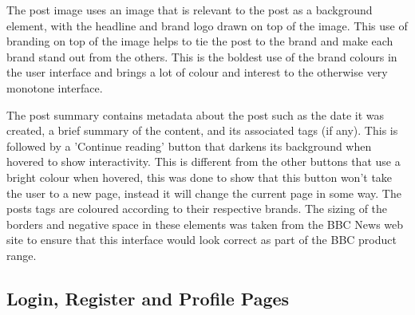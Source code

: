 \documentclass[12pt,titlepage]{article}
\begin{document}
    The post image uses an image that is relevant to the post as a background
    element, with the headline and brand logo drawn on top of the image. This
    use of branding on top of the image helps to tie the post to the brand and
    make each brand stand out from the others. This is the boldest use of the
    brand colours in the user interface and brings a lot of colour and interest
    to the otherwise very monotone interface.

    The post summary contains metadata about the post such as the date it was
    created, a brief summary of the content, and its associated tags (if any).
    This is followed by a 'Continue reading' button that darkens its background
    when hovered to show interactivity. This is different from the other
    buttons that use a bright colour when hovered, this was done to show that
    this button won't take the user to a new page, instead it will change the
    current page in some way. The posts tags are coloured according to their
    respective brands. The sizing of the borders and negative space in these
    elements was taken from the BBC News web site to ensure that this interface
    would look correct as part of the BBC product range.

    \subsection{Login, Register and Profile Pages}
\end{document}
